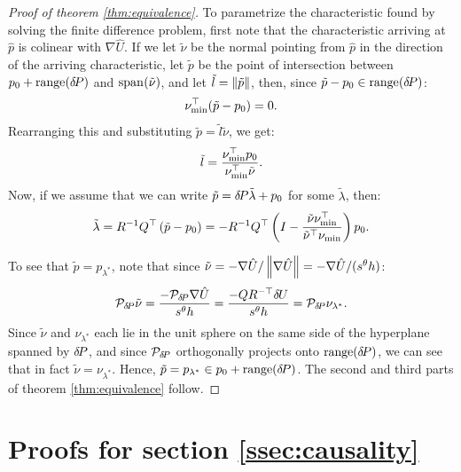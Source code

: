 \documentclass[smallcondensed]{svjour3}
\begin{document}
\begin{proof}[Proof of theorem \ref{thm:equivalence}]
  To parametrize the characteristic found by solving the finite
  difference problem, first note that the characteristic arriving at
  $\hat{p}$ is colinear with $\nabla \hat{U}$. If we let $\tilde{\nu}$
  be the normal pointing from $\hat{p}$ in the direction of the
  arriving characteristic, let $\tilde{p}$ be the point of
  intersection between
  $p_0 + \operatorname{range}\hspace{-0.15em}{({\delta \hspace{-0.14em} P})}$ and
  $\operatorname{span}\hspace{-0.15em}{(\tilde{\nu})}$, and let
  $\tilde{l} = \left\|\tilde{p}\right\|$, then, since
  $\tilde{p} - p_0 \in \operatorname{range}\hspace{-0.15em}{({\delta \hspace{-0.14em} P})}$:
  \begin{equation}
    \nu_{\operatorname{min}}^\top (\tilde{p} - p_0) = 0.
  \end{equation}
  Rearranging this and substituting
  $\tilde{p} = \tilde{l} \tilde{\nu}$, we get:
  \begin{equation}
    \tilde{l} = \frac{\nu_{\operatorname{min}}^\top p_0}{\nu_{\operatorname{min}}^\top \tilde{\nu}}.
  \end{equation}
  Now, if we assume that we can write
  $\tilde{p} = {\delta \hspace{-0.14em} P} \tilde{\lambda} + p_0$ for some
  $\tilde{\lambda}$, then:
  \begin{equation}
    \tilde{\lambda} = R^{-1} Q^\top \left(\tilde{p} - p_0\right) = -R^{-1} Q^\top \left(I - \frac{\tilde{\nu} \nu_{\operatorname{min}}^\top}{\tilde{\nu}^\top \nu_{\operatorname{min}}}\right) p_0.
  \end{equation}

  To see that $\tilde{p} = p_{\lambda^*}$, note that since
  $\tilde{\nu} = -\nabla \hat{U}/\left\|\nabla \hat{U}\right\| = -\nabla
  \hat{U}/(s^\theta h)$:
  \begin{equation}
    \mathcal{P}_{{\delta \hspace{-0.14em} P}} \tilde{\nu} = \frac{-\mathcal{P}_{{\delta \hspace{-0.14em} P}} \nabla \hat{U}}{s^\theta h} = \frac{-QR^{-\top} {\delta \hspace{-0.09em} U}}{s^\theta h} = \mathcal{P}_{{\delta \hspace{-0.14em} P}} \nu_{\lambda^*}.
  \end{equation}
  Since $\tilde{\nu}$ and $\nu_{\lambda^*}$ each lie in the unit
  sphere on the same side of the hyperplane spanned by ${\delta \hspace{-0.14em} P}$, and
  since $\mathcal{P}_{{\delta \hspace{-0.14em} P}}$ orthogonally projects onto
  $\operatorname{range}({\delta \hspace{-0.14em} P})$, we can see that in fact
  $\tilde{\nu} = \nu_{\lambda^*}$. Hence,
  $\tilde{p} = p_{\lambda^*} \in p_0 + \operatorname{range}({\delta \hspace{-0.14em} P})$. The second and
  third parts of theorem \ref{thm:equivalence} follow.
\end{proof}

\section{Proofs for section\@
  \ref{ssec:causality}}\label{sec:causality-proofs}
\end{document}
